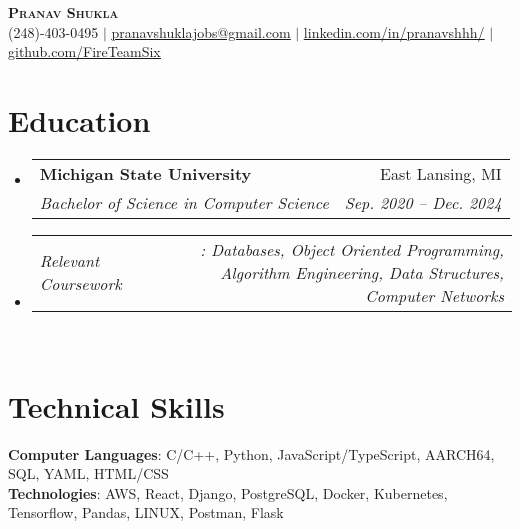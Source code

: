 \documentclass[letterpaper,11pt]{article}
\makeatletter
\newcommand{\resumeSubheading}[4]{
  \vspace{-2pt}\item
    \begin{tabular*}{0.97\textwidth}[t]{l@{\extracolsep{\fill}}r}
      \textbf{#1} & #2 \\
      \textit{\small#3} & \textit{\small #4} \\
    \end{tabular*}\vspace{-7pt}
}
\newcommand{\resumeSubSubheading}[2]{
    \item
    \begin{tabular*}{0.97\textwidth}{l@{\extracolsep{\fill}}r}
      \textit{\small#1} & \textit{\small #2} \\
    \end{tabular*}\vspace{-7pt}
}
\newcommand{\resumeSubHeadingListStart}{\begin{itemize}[leftmargin=0.15in, label={}]}
\newcommand{\resumeSubHeadingListEnd}{\end{itemize}}
\makeatother
\begin{document}

\begin{center}
    \textbf{\Huge \scshape Pranav Shukla} \\ \vspace{1pt}
    \small (248)-403-0495 $|$ \href{mailto:pranavshuklajobs@gmail.com}{\underline{pranavshuklajobs@gmail.com}} $|$ 
    \href{https://www.linkedin.com/in/pranavshhh/}{\underline{linkedin.com/in/pranavshhh/}} $|$
    \href{https://github.com/FireTeamSix}{\underline{github.com/FireTeamSix}}
\end{center}


\section{Education}
  \resumeSubHeadingListStart
    \resumeSubheading
      {Michigan State University}{East Lansing, MI}
      {Bachelor of Science in Computer Science}{Sep. 2020 -- Dec. 2024}
    \resumeSubSubheading
      {Relevant Coursework}{: Databases, Object Oriented Programming, Algorithm Engineering, Data Structures, Computer Networks} \\

  \resumeSubHeadingListEnd

\section{Technical Skills}
 \begin{itemize}[leftmargin=0.15in, label={}]
    \small{\item{
     \textbf{Computer Languages}{: C/C++, Python, JavaScript/TypeScript, AARCH64, SQL, YAML, HTML/CSS} \\
     \textbf{Technologies}{: AWS, React, Django, PostgreSQL, Docker, Kubernetes, Tensorflow, Pandas, LINUX, Postman, Flask} \\
    }}
 \end{itemize}
\end{document}
